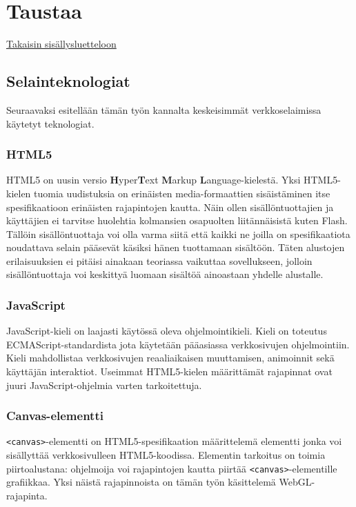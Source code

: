 \section{Taustaa}
\label{sec:taustaa}
\hyperlink{index}{Takaisin sisällysluetteloon}

\subsection{Selainteknologiat}
Seuraavaksi esitellään tämän työn kannalta keskeisimmät verkkoselaimissa käytetyt teknologiat. 

\subsubsection{HTML5}
HTML5 on uusin versio \textbf{H}yper\textbf{T}ext \textbf{M}arkup \textbf{L}anguage-kielestä. Yksi HTML5-kielen tuomia uudistuksia on erinäisten media-formaattien sisäistäminen itse spesifikaatioon erinäisten rajapintojen kautta\cite{html5diff}. Näin ollen sisällöntuottajien ja käyttäjien ei tarvitse huolehtia kolmansien osapuolten liitännäisistä kuten Flash. Tällöin sisällöntuottaja voi olla varma siitä että kaikki ne joilla on spesifikaatiota noudattava selain pääsevät käsiksi hänen tuottamaan sisältöön. Täten alustojen erilaisuuksien ei pitäisi ainakaan teoriassa vaikuttaa sovellukseen, jolloin sisällöntuottaja voi keskittyä luomaan sisältöä ainoastaan yhdelle alustalle.

\subsubsection{JavaScript}
JavaScript-kieli on laajasti käytössä oleva ohjelmointikieli. Kieli on toteutus ECMAScript-standardista\cite{ecmascript} jota käytetään pääasiassa verkkosivujen ohjelmointiin\cite{mdnjs}. Kieli mahdollistaa verkkosivujen reaaliaikaisen muuttamisen, animoinnit sekä käyttäjän interaktiot. Useimmat HTML5-kielen määrittämät rajapinnat ovat juuri JavaScript-ohjelmia varten tarkoitettuja.

\subsubsection{Canvas-elementti}
\texttt{<canvas>}-elementti on HTML5-spesifikaation määrittelemä elementti jonka voi sisällyttää verkkosivulleen HTML5-koodissa. Elementin tarkoitus on toimia piirtoalustana: ohjelmoija voi rajapintojen kautta piirtää \texttt{<canvas>}-elementille grafiikkaa. Yksi näistä rajapinnoista on tämän työn käsittelemä WebGL-rajapinta.\cite{canvas_spec}


